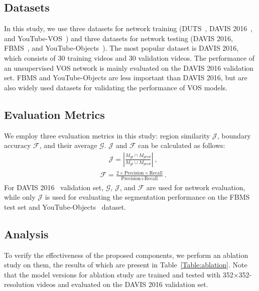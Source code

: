 \documentclass[10pt,twocolumn,letterpaper]{article}
\begin{document}
\subsection{Datasets}
\label{datasets}
In this study, we use three datasets for network training (DUTS~\cite{DUTS}, DAVIS 2016~\cite{DAVIS}, and YouTube-VOS~\cite{YTVOS}) and three datasets for network testing (DAVIS 2016, FBMS~\cite{FBMS}, and YouTube-Objects~\cite{YTOBJ}). The most popular dataset is DAVIS 2016, which consists of 30 training videos and 30 validation videos. The performance of an unsupervised VOS network is mainly evaluated on the DAVIS 2016 validation set. FBMS and YouTube-Objects are less important than DAVIS 2016, but are also widely used datasets for validating the performance of VOS models. 



\subsection{Evaluation Metrics}
We employ three evaluation metrics in this study: region similarity $\mathcal{J}$, boundary accuracy $\mathcal{F}$, and their average $\mathcal{G}$. $\mathcal{J}$ and $\mathcal{F}$ can be calculated as follows:
\begin{align}
&\mathcal{J} = \left| \frac{M_{gt} \cap M_{pred}}{M_{gt} \cup M_{pred}} \right|~,
\label{eq3}
\end{align}
\begin{align}
&\mathcal{F} = \frac{2 \times \text{Precision} \times \text{Recall}}{\text{Precision} + \text{Recall}}~.
\end{align}
For DAVIS 2016~\cite{DAVIS} validation set, $\mathcal{G}$, $\mathcal{J}$, and $\mathcal{F}$ are used for network evaluation, while only $\mathcal{J}$ is used for evaluating the segmentation performance on the FBMS~\cite{FBMS} test set and YouTube-Objects~\cite{YTOBJ} dataset.



\subsection{Analysis}
\label{analysis}
To verify the effectiveness of the proposed components, we perform an ablation study on them, the results of which are present in Table~\ref{Table:ablation}. Note that the model versions for ablation study are trained and tested with 352$\times$352-resolution videos and evaluated on the DAVIS 2016 validation set.
\end{document}
